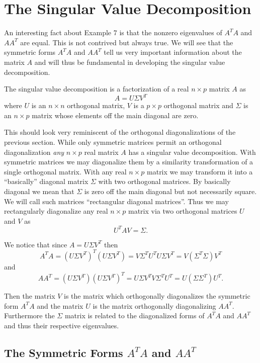 \documentclass{book}
\begin{document}
\section{The Singular Value Decomposition}

An interesting fact about Example $7$ is that the nonzero eigenvalues of $A^TA$ and $AA^T$ are equal. This is not contrived but always true. We will see that the symmetric forms $A^TA$ and $AA^T$ tell us very important information about the matrix $A$ and will thus be fundamental in developing the singular value decomposition. 

The singular value decomposition is a factorization of a real $n \times p$ matrix $A$ as 
$$
A=U\Sigma V^T
$$
where $U$ is an $n \times n$ orthogonal matrix, $V$ is a $p \times p$ orthogonal matrix and $\Sigma$ is an $n \times p$ matrix whose elements off the main diagonal are zero. 

This should look very reminiscent of the orthogonal diagonalizations of the previous section. While only symmetric matrices permit an orthogonal diagonalization \emph{any} $n \times p$ real matrix $A$ has a singular value decomposition. With symmetric matrices we may diagonalize them by a similarity transformation of a single orthogonal matrix. With any real $n \times p$ matrix we may transform it into a ``basically'' diagonal matrix $\Sigma$ with two orthogonal matrices. By basically diagonal we mean that $\Sigma$ is zero off the main diagonal but not necessarily square.  We will call such matrices ``rectangular diagonal matrices''. Thus we may rectangularly diagonalize any real $n \times p$ matrix via two orthogonal matrices $U$ and $V$ as
$$
U^TAV=\Sigma. 
$$

We notice that since $A=U\Sigma V^T$ then 
$$
A^TA=(U\Sigma V^T)^T(U\Sigma V^T)=V\Sigma^T U^TU\Sigma V^T=V(\Sigma^T\Sigma)V^T
$$
and
$$
AA^T=(U\Sigma V^T)(U\Sigma V^T)^T=U\Sigma V^TV\Sigma^T U^T=U(\Sigma \Sigma^T)U^T.
$$

Then the matrix $V$ is the matrix which orthogonally diagonalizes the symmetric form $A^TA$ and the matrix $U$ is the matrix orthogonally diagonalizing $AA^T$. Furthermore the $\Sigma$ matrix is related to the diagonalized forms of $A^TA$ and $AA^T$ and thus their respective eigenvalues. 

\subsection{The Symmetric Forms $A^TA$ and $AA^T$}
\end{document}
